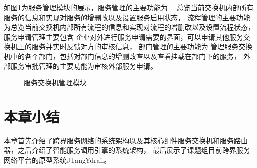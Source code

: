 如图\ref{fig:fuwuguanli}为服务管理模块的展示，服务管理的主要功能为：
总览当前交换机内部所有服务的信息和实现对服务的增删改以及设置服务启用状态，
流程管理的主要功能为总览当前交换机内部所有流程的信息和实现对流程的增删改以及设置流程状态，
服务申请管理主要包含
企业对外进行服务申请需要的界面，可以申请其他服务交换机上的服务并实时反馈对方的审核信息，
部门管理的主要功能为
管理服务交换机中的各个部门，包括对部门信息的增删改查以及查看挂载在部门下的服务，
外部服务审批管理的主要功能为审核外部服务申请。
\begin{figure}[htbp]
  \caption{服务交换机管理模块}
  \label{fig:fuwuguanli}
  \end{figure}

\section{本章小结}
本章首先介绍了跨界服务网络的系统架构以及其核心组件服务交换机和服务路由器，之后介绍了智能服务调用引擎的系统架构，
最后展示了课题组目前跨界服务网络平台的原型系统JTangYdrail。
